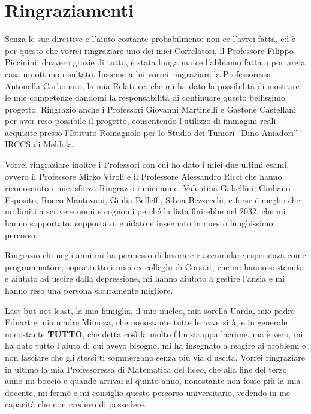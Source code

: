 \chapter*{Ringraziamenti}
\noindent Senza le sue direttive e l'aiuto costante probabilmente non ce l'avrei fatta, ed è per questo che vorrei ringraziare uno dei miei Correlatori, il Professore Filippo Piccinini, davvero grazie di tutto, è stata lunga ma ce l'abbiamo fatta a portare a casa un ottimo risultato. Insieme a lui vorrei ringraziare la Professoressa Antonella Carbonaro, la mia Relatrice, che mi ha dato la possibilità di mostrare le mie competenze dandomi la responsabilità di continuare questo bellissimo progetto. Ringrazio anche i Professori Giovanni Martinelli e Gastone Castellani per aver reso possibile il progetto, consentendo l'utilizzo di immagini reali acquisite presso l’Istituto Romagnolo per lo Studio dei Tumori ``Dino Amadori'' IRCCS di Meldola.\hfill\break

\noindent Vorrei ringraziare inoltre i Professori con cui ho dato i miei due ultimi esami, ovvero il Professore Mirko Viroli e il Professore Alessandro Ricci che hanno riconosciuto i miei sforzi. Ringrazio i miei amici Valentina Gabellini, Giuliano Esposito, Rocco Mantovani, Giulia Belleffi, Silvia Bezzecchi, e forse è meglio che mi limiti a scrivere nomi e cognomi perché la lista finirebbe nel 2032, che mi hanno sopportato, supportato, guidato e insegnato in questo lunghissimo percorso.\hfill\break 

\noindent Ringrazio chi negli anni mi ha permesso di lavorare e accumulare esperienza come programmatore, soprattutto i miei ex-colleghi di Corsi.it, che mi hanno sostenuto e aiutato ad uscire dalla depressione, mi hanno aiutato a gestire l'ansia e mi hanno reso una persona sicuramente migliore.\hfill\break

\noindent Last but not least, la mia famiglia, il mio nucleo, mia sorella Uarda, mio padre Eduart e mia madre Mimoza, che nonostante tutte le avversità, e in generale nonostante \textbf{TUTTO}, che detta così fa molto film strappa lacrime, ma è vero, mi ha dato tutto l'aiuto di cui avevo bisogno, mi ha insegnato a reagire ai problemi e non lasciare che gli stessi ti sommergano senza più via d'uscita. Vorrei ringraziare in ultimo la mia Professoressa di Matematica del liceo, che alla fine del terzo anno mi bocciò e quando arrivai al quinto anno, nonostante non fosse più la mia docente, mi fermò e mi consiglio questo percorso universitario, vedendo in me capacità che non credevo di possedere.